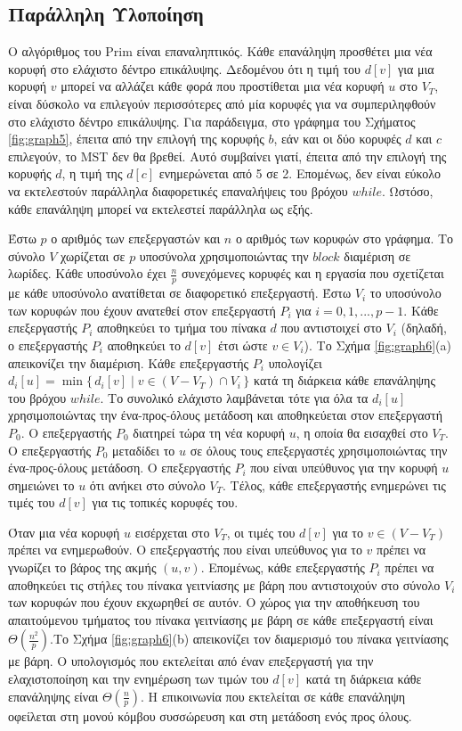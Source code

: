 \documentclass[12pt,a4paper]{article} %
\begin{document}
\subsection*{Παράλληλη Υλοποίηση}
Ο αλγόριθμος του Prim είναι επαναληπτικός. Κάθε επανάληψη προσθέτει μια νέα κορυφή στο ελάχιστο δέντρο επικάλυψης. Δεδομένου ότι η τιμή του $d[v]$ για μια κορυφή $v$ μπορεί να αλλάζει κάθε φορά που προστίθεται μια νέα κορυφή $u$ στο $V_T$, είναι δύσκολο να επιλεγούν περισσότερες από μία κορυφές για να συμπεριληφθούν στο ελάχιστο δέντρο επικάλυψης. Για παράδειγμα, στο γράφημα του Σχήματος \ref{fig:graph5}, έπειτα από την επιλογή της κορυφής $b$, εάν και οι δύο κορυφές $d$ και $c$ επιλεγούν, το MST δεν θα βρεθεί. Αυτό συμβαίνει γιατί, έπειτα από την επιλογή της κορυφής $d$, η τιμή της $d[c]$ ενημερώνεται από 5 σε 2. Επομένως, δεν είναι εύκολο να εκτελεστούν παράλληλα διαφορετικές επαναλήψεις του βρόχου $while$. Ωστόσο, κάθε επανάληψη μπορεί να εκτελεστεί παράλληλα ως εξής. 

Έστω $p$ ο αριθμός των επεξεργαστών και $n$ ο αριθμός των κορυφών στο γράφημα. Το σύνολο $V$ χωρίζεται σε $p$ υποσύνολα χρησιμοποιώντας την $block$ διαμέριση σε λωρίδες. Κάθε υποσύνολο έχει $\frac{n}{p}$ συνεχόμενες κορυφές και η εργασία που σχετίζεται με κάθε υποσύνολο ανατίθεται σε διαφορετικό επεξεργαστή. Έστω $V_i$ το υποσύνολο των κορυφών που έχουν ανατεθεί στον επεξεργαστή $P_i$ για $i = 0, 1, ..., p - 1$. Κάθε επεξεργαστής $P_i$ αποθηκεύει το τμήμα του πίνακα $d$ που αντιστοιχεί στο $V_i$ (δηλαδή, ο επεξεργαστής $P_i$ αποθηκεύει το $d[v]$ έτσι ώστε $v \in V_i$). Το Σχήμα \ref{fig:graph6}(a) απεικονίζει την διαμέριση. Κάθε επεξεργαστής $P_i$ υπολογίζει $d_i[u] = \min \{\, d_i[v] \mid v \in (V - V_T) \cap V_i \,\}$ κατά τη διάρκεια κάθε επανάληψης του βρόχου $while$. Το συνολικό ελάχιστο λαμβάνεται τότε για όλα τα $d_i[u]$ χρησιμοποιώντας την ένα-προς-όλους μετάδοση και αποθηκεύεται στον επεξεργαστή $P_0$. Ο επεξεργαστής $P_0$ διατηρεί τώρα τη νέα κορυφή $u$, η οποία θα εισαχθεί στο $V_T$. Ο επεξεργαστής $P_0$ μεταδίδει το $u$ σε όλους τους επεξεργαστές χρησιμοποιώντας την ένα-προς-όλους μετάδοση. Ο επεξεργαστής $P_i$ που είναι υπεύθυνος για την κορυφή $u$ σημειώνει το $u$ ότι ανήκει στο σύνολο $V_T$. Τέλος, κάθε επεξεργαστής ενημερώνει τις τιμές του $d[v]$ για τις τοπικές κορυφές του. 

Όταν μια νέα κορυφή $u$ εισέρχεται στο $V_T$, οι τιμές του $d[v]$ για το $v \in (V - V_T)$ πρέπει να ενημερωθούν. Ο επεξεργαστής που είναι υπεύθυνος για το $v$ πρέπει να γνωρίζει το βάρος της ακμής $(u, v)$. Επομένως, κάθε επεξεργαστής $P_i$ πρέπει να αποθηκεύει τις στήλες του πίνακα γειτνίασης με βάρη που αντιστοιχούν στο σύνολο $V_i$ των κορυφών που έχουν εκχωρηθεί σε αυτόν. Ο χώρος για την αποθήκευση του απαιτούμενου τμήματος του πίνακα γειτνίασης με βάρη σε κάθε επεξεργαστή είναι $\Theta\!\left(\frac{n^2}{p}\right)$.Το Σχήμα \ref{fig:graph6}(b) απεικονίζει τον διαμερισμό του πίνακα γειτνίασης με βάρη. Ο υπολογισμός που εκτελείται από έναν επεξεργαστή για την ελαχιστοποίηση και την ενημέρωση των τιμών του $d[v]$ κατά τη διάρκεια κάθε επανάληψης είναι $\Theta\!\left(\frac{n}{p}\right)$. Η επικοινωνία που εκτελείται σε κάθε επανάληψη οφείλεται στη μονού κόμβου συσσώρευση και στη μετάδοση ενός προς όλους.
\vspace{0.3cm}
\end{document}
